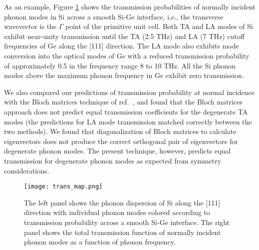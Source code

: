\documentclass[11pt]{article}
\begin{document}
As an example, Figure \ref{mode_resolved_trans} shows the transmission probabilities of normally incident phonon modes in Si across a smooth Si-Ge interface, i.e., the transverse wavevector is the $\Gamma$ point of the primitive unit cell. Both TA and LA modes of Si exhibit near-unity transmission until the TA (2.5 THz) and LA (7 THz) cutoff frequencies of Ge along the [111] direction. The LA mode also exhibits mode conversion into the optical modes of Ge with a reduced transmission probability of approximately 0.5 in the frequency range 8 to 10 THz. All the Si phonon modes above the maximum phonon frequency in Ge exhibit zero transmission.  

We also compared our predictions of transmission probability at normal incidence with the Bloch matrices technique of ref.~\cite{ong2015efficient}, and found that the Bloch matrices approach does not predict equal transmission coefficients for the degenerate TA modes (the predictions for LA mode transmission matched correctly between the two methods). We found that diagonalization of Bloch matrices to calculate eigenvectors does not produce the correct orthogonal pair of eigenvectors for degenerate phonon modes. The present technique, however, predicts equal transmission for degenerate phonon modes as expected from symmetry considerations.

\begin{figure}
\begin{center}
\texttt{[image: trans\_map.png]}
\caption{The left panel shows the phonon dispersion of Si along the [111] direction with individual phonon modes colored according to transmission probability across a smooth Si-Ge interface. The right panel shows the total transmission function of normally incident phonon modes as a function of phonon frequency. }
\label{mode_resolved_trans}
\end{center}
\end{figure}
\end{document}
